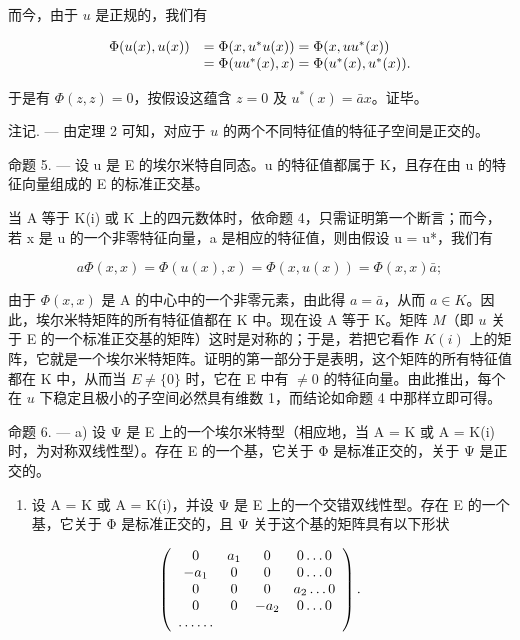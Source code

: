 而今，由于 \(u\) 是正规的，我们有

\[
\begin{array}{r l} \Phi (u (x), u (x)) & = \Phi (x, u ^ {*} u (x)) = \Phi (x, u u ^ {*} (x)) \\ & = \Phi (u u ^ {*} (x), x) = \Phi (u ^ {*} (x), u ^ {*} (x)). \end{array}
\]

于是有 \(\Phi(z, z) = 0\)，按假设这蕴含 \(z = 0\) 及 \(u^{*}(x) = \bar{a}x\)。证毕。

注记. --- 由定理 2 可知，对应于 \(u\) 的两个不同特征值的特征子空间是正交的。

命题 5. --- 设 u 是 E 的埃尔米特自同态。u 的特征值都属于 K，且存在由 u 的特征向量组成的 E 的标准正交基。

当 A 等于 K(i) 或 K 上的四元数体时，依命题 4，只需证明第一个断言；而今，若 x 是 u 的一个非零特征向量，a 是相应的特征值，则由假设 u = u*，我们有

\[
a \Phi (x, x) = \Phi (u (x), x) = \Phi (x, u (x)) = \Phi (x, x) \bar {a};
\]

由于 \(\Phi(x, x)\) 是 A 的中心中的一个非零元素，由此得 \(a = \bar{a}\)，从而 \(a \in K\)。因此，埃尔米特矩阵的所有特征值都在 K 中。现在设 A 等于 K。矩阵 \(M\)（即 \(u\) 关于 E 的一个标准正交基的矩阵）这时是对称的；于是，若把它看作 \(K(i)\) 上的矩阵，它就是一个埃尔米特矩阵。证明的第一部分于是表明，这个矩阵的所有特征值都在 K 中，从而当 \(E \neq \{0\}\) 时，它在 E 中有 \(\neq 0\) 的特征向量。由此推出，每个在 \(u\) 下稳定且极小的子空间必然具有维数 1，而结论如命题 4 中那样立即可得。

命题 6. --- a) 设 Ψ 是 E 上的一个埃尔米特型（相应地，当 A = K 或 A = K(i) 时，为对称双线性型）。存在 E 的一个基，它关于 Φ 是标准正交的，关于 Ψ 是正交的。

\begin{enumerate}
\def\labelenumi{\alph{enumi})}
\setcounter{enumi}{1}
\tightlist
\item
  设 A = K 或 A = K(i)，并设 Ψ 是 E 上的一个交错双线性型。存在 E 的一个基，它关于 Φ 是标准正交的，且 Ψ 关于这个基的矩阵具有以下形状
\end{enumerate}

\[
\left( \begin{array}{c c c c} 0 & a _ {1} & 0 & 0 \ldots 0 \\ - a _ {1} & 0 & 0 & 0 \ldots 0 \\ 0 & 0 & 0 & a _ {2} \ldots 0 \\ 0 & 0 & - a _ {2} & 0 \ldots 0 \\ \ldots \ldots \end{array} \right).
\]

